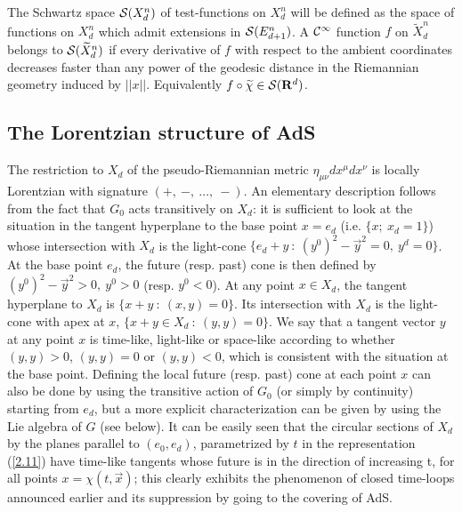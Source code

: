 \documentclass[a4paper,a4paper]{article}
\def\bR{{\bf R}}
\def\CC{{\cal C}}
\def\SS{{\cal S}}
\def\wt{\widetilde}
\def\Xdn{X_d^n}
\def\wXdn{{\wt X_d^n}}
\def\amb{E_{d+1}}
\def\wchi{{\wt \chi}}
\begin{document}
\vskip 0.2cm

The Schwartz space $\SS(\Xdn)$ of test-functions on $\Xdn$ will be
defined as the space of functions on $\Xdn$ which admit
extensions in $\SS(\amb^n)$. A $\CC^\infty$ function $f$ on $\wXdn$
belongs to $\SS(\wXdn)$ if every derivative of $f$ with respect to
the ambient coordinates decreases faster than any power of the geodesic
distance in the Riemannian geometry induced by $||x||$. Equivalently
$f\circ \wchi \in \SS(\bR^{d})$.


\subsection{The Lorentzian structure of AdS}

The restriction to $X_d$ of the pseudo-Riemannian metric
$\eta_{\mu\nu}dx^\mu dx^\nu$ is locally Lorentzian with signature
$(+,\ -,\ \ldots,\ -)$.
An elementary description follows from the fact that
$G_0$ acts transitively on $X_d$: it is sufficient to
look at the situation in the tangent hyperplane to the
base point $x= e_d$ (i.e. $ \{x; \ x_d =1\}$) whose intersection with
$X_d$ is the light-cone $\{e_d+y\ :\ (y^0)^2 - {\vec y}^2 =0,\ y^d=0\}$.
At the base point $e_d$, the future (resp. past) cone is then defined
by $(y^0)^2 - {\vec y}^2 >0,\ y^0>0$ (resp. $y^0 <0$).
At any point $x \in X_d$, the tangent hyperplane
to $X_d$ is $\{x+y\ :\ (x,y) = 0\}$. Its intersection with $X_d$
is the light-cone with apex at $x$, $\{x+y \in X_d\ :\ (y,y) =
0\}$. We say that a tangent vector $y$ at any point $x$
is time-like, light-like or space-like according to whether
$(y,y) >0$, $(y,y) =0$ or $(y,y) < 0$, which is consistent
with the situation at the base point.
Defining the local future (resp. past) cone at each point $x$
can also be done by using the transitive action of $G_0$
(or simply by continuity)
starting from $e_d$, but a more explicit
characterization can be
given by using the Lie algebra of $G$ (see below).
It can be easily seen
that the circular sections of $X_d$ by the planes
parallel to $(e_0, e_d)$, parametrized by $t$ in the representation
(\ref{2.11}) have time-like tangents whose future is
in the direction of increasing t, for all points $x= \chi (t,\vec x)$;
this clearly exhibits the phenomenon of closed
time-loops announced earlier and its suppression by going to
the covering of AdS.
\end{document}
